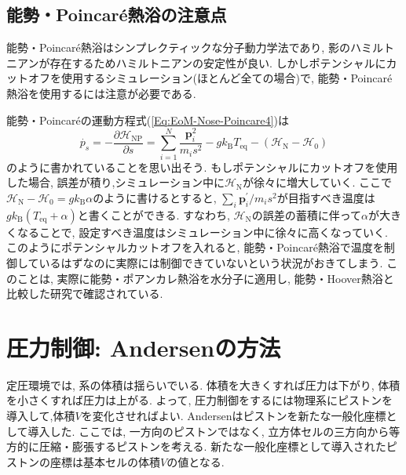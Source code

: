 \subsection{能勢・Poincar\'{e}熱浴の注意点}
能勢・Poincar\'{e}熱浴はシンプレクティックな分子動力学法であり, 影のハミルトニアンが存在するためハミルトニアンの安定性が良い. しかしポテンシャルにカットオフを使用するシミュレーション(ほとんど全ての場合)で, 能勢・Poincar\'{e}熱浴を使用するには注意が必要である. 

能勢・Poincar\'{e}の運動方程式(\ref{Eq:EoM-Nose-Poincare4})は
\begin{equation}
  \dot{p_{s}}
  =-
  \frac{\partial \mathcal{H}_{\mathrm{NP}}}{\partial s}
  =
  \sum_{i=1}^{N}
  \frac{\bm{p}_{i}^{2}}{m_{i}s^{2}}
  - g k_{\mathrm{B}} T_{\mathrm{eq}}
  - (\mathcal{H}_{\mathrm{N}} - \mathcal{H}_{0})
\end{equation}
のように書かれていることを思い出そう. もしポテンシャルにカットオフを使用した場合, 誤差が積り,シミュレーション中に$\mathcal{H}_{\mathrm{N}}$が徐々に増大していく.
ここで$\mathcal{H}_{\mathrm{N}} - \mathcal{H}_{0} = g k_{\mathrm{B}} \alpha$のように書けるとすると, $\sum_{i}\bm{p}_{i}^{\prime}/m_{i}s^{2}$が目指すべき温度は$g k_{\mathrm{B}} (T_{\mathrm{eq}} + \alpha)$と書くことができる. すなわち, $\mathcal{H}_{\mathrm{N}}$の誤差の蓄積に伴って$\alpha$が大きくなることで, 設定すべき温度はシミュレーション中に徐々に高くなっていく. このようにポテンシャルカットオフを入れると, 能勢・Poincar\'{e}熱浴で温度を制御しているはずなのに実際には制御できていないという状況がおきてしまう. このことは, 実際に能勢・ポアンカレ熱浴を水分子に適用し, 能勢・Hoover熱浴と比較した研究\cite{Okumura2007}で確認されている.


\clearpage
\section{圧力制御: Andersenの方法}
定圧環境では, 系の体積は揺らいでいる. 
体積を大きくすれば圧力は下がり, 体積を小さくすれば圧力は上がる. 
よって, 圧力制御をするには物理系にピストンを導入して,体積$V$を変化させればよい. 
Andersenはピストンを新たな一般化座標として導入した\cite{1980Andersen}. 
ここでは, 一方向のピストンではなく, 立方体セルの三方向から等方的に圧縮・膨張するピストンを考える. 
新たな一般化座標として導入されたピストンの座標は基本セルの体積$V$の値となる.

